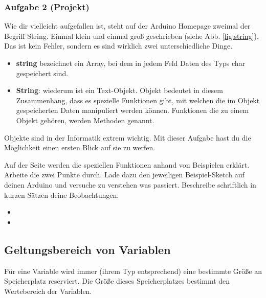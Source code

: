 \subsubsection{Aufgabe 2 (Projekt)}
Wie dir vielleicht aufgefallen ist, steht auf der Arduino Homepage   zweimal der Begriff String. Einmal klein und einmal groß geschrieben (siehe Abb. \ref{fig:string}). Das ist kein Fehler, sondern es sind wirklich zwei unterschiedliche Dinge. 

\begin{itemize}
  \item[] \textbf{string} bezeichnet ein Array, bei dem in jedem Feld Daten des Typs char gespeichert sind. 
  \item[] \textbf{String}: wiederum ist ein Text-Objekt. Objekt bedeutet in diesem Zusammenhang, dass es spezielle Funktionen gibt, mit welchen die im Objekt gespeicherten Daten manipuliert werden können. Funktionen die zu einem Objekt gehören, werden Methoden genannt.
\end{itemize}


Objekte sind in der Informatik extrem wichtig. Mit dieser Aufgabe hast du die Möglichkeit einen ersten Blick auf sie zu werfen.

Auf der Seite  werden die speziellen Funktionen anhand von Beispielen erklärt. Arbeite die zwei Punkte durch. Lade dazu den jeweiligen Beispiel-Sketch auf deinen Arduino und versuche zu verstehen was passiert. Beschreibe schriftlich in kurzen Sätzen deine Beobachtungen.
\begin{itemize}
  \item {}
  \item {}
\end{itemize}


\subsection{Geltungsbereich von Variablen}

Für eine Variable wird immer (ihrem Typ entsprechend) eine bestimmte Größe an Speicherplatz reserviert. Die Größe dieses Speicherplatzes bestimmt den Wertebereich der Variablen.

